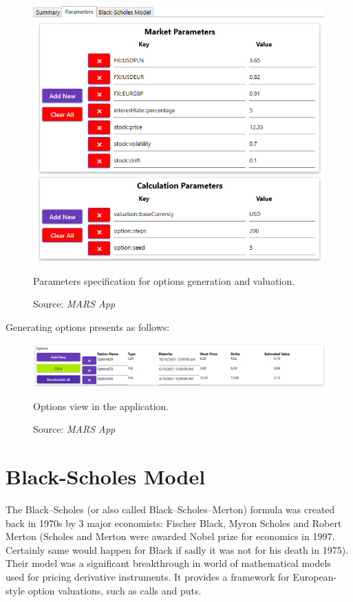     \begin{figure}[H]
            \centering
            \includegraphics[width=\textwidth]{img/specifyParameters.png}
            \caption{Parameters specification for options generation and valuation.}
            \caption*{Source: \textit{MARS App}}
            \label{fig:parametersPresentation}
    \end{figure}
    Generating options presents as follows:
    \begin{figure}[H]
            \centering
            \includegraphics[width=\textwidth]{img/optionsPresentation.png}
            \caption{Options view in the application.}
            \caption*{Source: \textit{MARS App}}
            \label{fig:optionsPresentation}
    \end{figure}
\section{Black-Scholes Model}
    The Black--Scholes (or also called Black--Scholes--Merton) formula was created back in 1970s by 3 major economists: Fischer Black, Myron Scholes and Robert Merton (Scholes and Merton were awarded Nobel prize for economics in 1997. Certainly same would happen for Black if sadly it was not for his death in 1975).
    Their model was a significant breakthrough in world of mathematical models used for pricing derivative instruments. It provides a framework for European-style option valuations, such as calls and puts.
    

